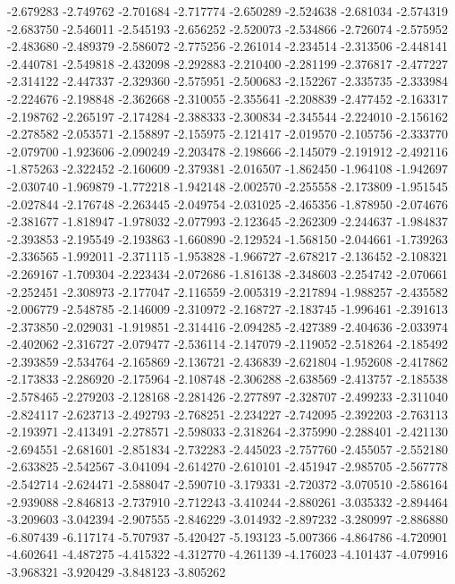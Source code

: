 -2.679283
-2.749762
-2.701684
-2.717774
-2.650289
-2.524638
-2.681034
-2.574319
-2.683750
-2.546011
-2.545193
-2.656252
-2.520073
-2.534866
-2.726074
-2.575952
-2.483680
-2.489379
-2.586072
-2.775256
-2.261014
-2.234514
-2.313506
-2.448141
-2.440781
-2.549818
-2.432098
-2.292883
-2.210400
-2.281199
-2.376817
-2.477227
-2.314122
-2.447337
-2.329360
-2.575951
-2.500683
-2.152267
-2.335735
-2.333984
-2.224676
-2.198848
-2.362668
-2.310055
-2.355641
-2.208839
-2.477452
-2.163317
-2.198762
-2.265197
-2.174284
-2.388333
-2.300834
-2.345544
-2.224010
-2.156162
-2.278582
-2.053571
-2.158897
-2.155975
-2.121417
-2.019570
-2.105756
-2.333770
-2.079700
-1.923606
-2.090249
-2.203478
-2.198666
-2.145079
-2.191912
-2.492116
-1.875263
-2.322452
-2.160609
-2.379381
-2.016507
-1.862450
-1.964108
-1.942697
-2.030740
-1.969879
-1.772218
-1.942148
-2.002570
-2.255558
-2.173809
-1.951545
-2.027844
-2.176748
-2.263445
-2.049754
-2.031025
-2.465356
-1.878950
-2.074676
-2.381677
-1.818947
-1.978032
-2.077993
-2.123645
-2.262309
-2.244637
-1.984837
-2.393853
-2.195549
-2.193863
-1.660890
-2.129524
-1.568150
-2.044661
-1.739263
-2.336565
-1.992011
-2.371115
-1.953828
-1.966727
-2.678217
-2.136452
-2.108321
-2.269167
-1.709304
-2.223434
-2.072686
-1.816138
-2.348603
-2.254742
-2.070661
-2.252451
-2.308973
-2.177047
-2.116559
-2.005319
-2.217894
-1.988257
-2.435582
-2.006779
-2.548785
-2.146009
-2.310972
-2.168727
-2.183745
-1.996461
-2.391613
-2.373850
-2.029031
-1.919851
-2.314416
-2.094285
-2.427389
-2.404636
-2.033974
-2.402062
-2.316727
-2.079477
-2.536114
-2.147079
-2.119052
-2.518264
-2.185492
-2.393859
-2.534764
-2.165869
-2.136721
-2.436839
-2.621804
-1.952608
-2.417862
-2.173833
-2.286920
-2.175964
-2.108748
-2.306288
-2.638569
-2.413757
-2.185538
-2.578465
-2.279203
-2.128168
-2.281426
-2.277897
-2.328707
-2.499233
-2.311040
-2.824117
-2.623713
-2.492793
-2.768251
-2.234227
-2.742095
-2.392203
-2.763113
-2.193971
-2.413491
-2.278571
-2.598033
-2.318264
-2.375990
-2.288401
-2.421130
-2.694551
-2.681601
-2.851834
-2.732283
-2.445023
-2.757760
-2.455057
-2.552180
-2.633825
-2.542567
-3.041094
-2.614270
-2.610101
-2.451947
-2.985705
-2.567778
-2.542714
-2.624471
-2.588047
-2.590710
-3.179331
-2.720372
-3.070510
-2.586164
-2.939088
-2.846813
-2.737910
-2.712243
-3.410244
-2.880261
-3.035332
-2.894464
-3.209603
-3.042394
-2.907555
-2.846229
-3.014932
-2.897232
-3.280997
-2.886880
-6.807439
-6.117174
-5.707937
-5.420427
-5.193123
-5.007366
-4.864786
-4.720901
-4.602641
-4.487275
-4.415322
-4.312770
-4.261139
-4.176023
-4.101437
-4.079916
-3.968321
-3.920429
-3.848123
-3.805262
